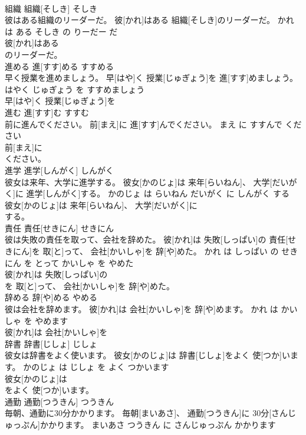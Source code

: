 \documentclass[8pt]{extreport}
\begin{document}
\begin{CJK}{UTF8}{min}
\\	組織	組織[そしき]	そしき	
\\	彼はある組織のリーダーだ。	彼[かれ]はある 組織[そしき]のリーダーだ。	かれ は ある そしき の りーだー だ	
\\	彼[かれ]はある
\\	のリーダーだ。			
\\	進める	進[すす]める	すすめる	
\\	早く授業を進めましょう。	早[はや]く 授業[じゅぎょう]を 進[すす]めましょう。	はやく じゅぎょう を すすめましょう	
\\	早[はや]く 授業[じゅぎょう]を
\\	進む	進[すす]む	すすむ	
\\	前に進んでください。	前[まえ]に 進[すす]んでください。	まえ に すすんで ください	
\\	前[まえ]に
\\	ください。			
\\	進学	進学[しんがく]	しんがく	
\\	彼女は来年、大学に進学する。	彼女[かのじょ]は 来年[らいねん]、 大学[だいがく]に 進学[しんがく]する。	かのじょ は らいねん だいがく に しんがく する	
\\	彼女[かのじょ]は 来年[らいねん]、 大学[だいがく]に
\\	する。			
\\	責任	責任[せきにん]	せきにん	
\\	彼は失敗の責任を取って、会社を辞めた。	彼[かれ]は 失敗[しっぱい]の 責任[せきにん]を 取[と]って、 会社[かいしゃ]を 辞[や]めた。	かれ は しっぱい の せきにん を とって かいしゃ を やめた	
\\	彼[かれ]は 失敗[しっぱい]の
\\	を 取[と]って、 会社[かいしゃ]を 辞[や]めた。			
\\	辞める	辞[や]める	やめる	
\\	彼は会社を辞めます。	彼[かれ]は 会社[かいしゃ]を 辞[や]めます。	かれ は かいしゃ を やめます	
\\	彼[かれ]は 会社[かいしゃ]を
\\	辞書	辞書[じしょ]	じしょ	
\\	彼女は辞書をよく使います。	彼女[かのじょ]は 辞書[じしょ]をよく 使[つか]います。	かのじょ は じしょ を よく つかいます	
\\	彼女[かのじょ]は
\\	をよく 使[つか]います。			
\\	通勤	通勤[つうきん]	つうきん	
\\	毎朝、通勤に30分かかります。	毎朝[まいあさ]、 通勤[つうきん]に 30分[さんじゅっぷん]かかります。	まいあさ つうきん に さんじゅっぷん かかります	

\end{CJK}
\end{document}
